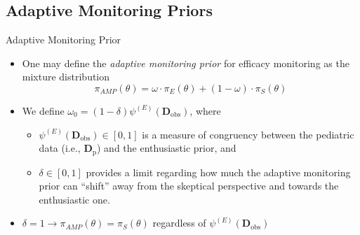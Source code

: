 \documentclass{beamer}
\begin{document}
\subsection{Adaptive Monitoring Priors}

\begin{frame}{Adaptive Monitoring Prior}
\begin{itemize}
	\item 
	One may define the \textit{adaptive monitoring prior} for efficacy monitoring as the mixture distribution	
	\begin{equation*}
		\pi_{AMP}\left(\theta\right)=\omega\cdot\pi_E(\theta)+(1 - \omega)\cdot \pi_S(\theta)
	\end{equation*}
	
	\vspace{0.2cm}
	\item We define $\omega_0 = (1 - \delta) \psi^{(E)}(\mathbf{D}_{\text{obs}})$, where 
	
	\begin{itemize}
	  \vspace{0.2cm}	
		\item $\psi^{(E)}(\mathbf{D}_{\text{obs}}) \in [0,1]$ is a measure
		      of congruency between the pediatric data (i.e., $\mathbf{D}_{\text{p}}$) and the enthusiastic prior, and
					
		\vspace{0.2cm}		
		\item $\delta \in [0,1]$ provides a limit regarding how much the adaptive monitoring prior can ``shift'' away from
					the skeptical perspective and towards the enthusiastic one.			
	\end{itemize}
	
		\vspace{0.2cm}								
		\item $\delta=1 \rightarrow \pi_{AMP}\left(\theta\right) = \pi_{S}\left(\theta\right)$ regardless of $\psi^{(E)}(\mathbf{D}_{\text{obs}})$	
					
\end{itemize}
\end{frame}
\end{document}
